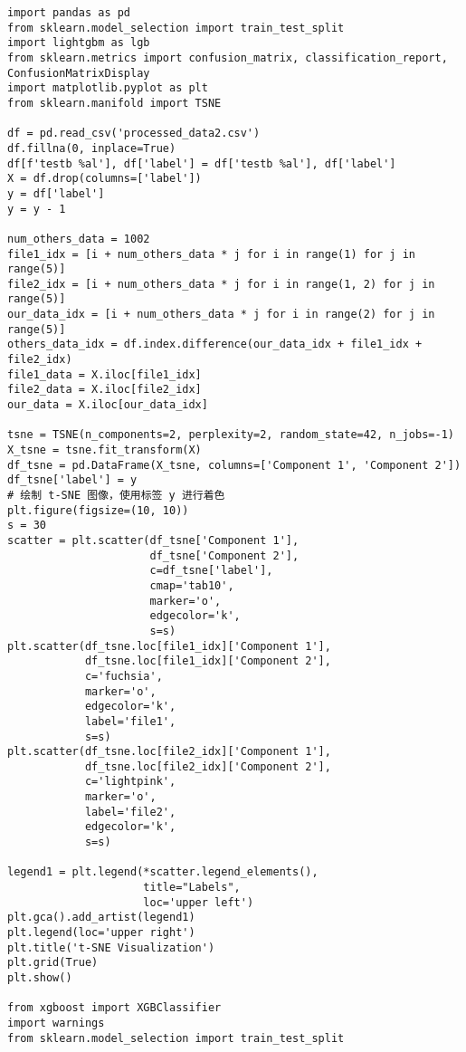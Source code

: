 \begin{lstlisting}
import pandas as pd
from sklearn.model_selection import train_test_split
import lightgbm as lgb
from sklearn.metrics import confusion_matrix, classification_report, ConfusionMatrixDisplay
import matplotlib.pyplot as plt
from sklearn.manifold import TSNE

df = pd.read_csv('processed_data2.csv')
df.fillna(0, inplace=True)
df[f'testb %al'], df['label'] = df['testb %al'], df['label']
X = df.drop(columns=['label'])
y = df['label']
y = y - 1

num_others_data = 1002
file1_idx = [i + num_others_data * j for i in range(1) for j in range(5)]
file2_idx = [i + num_others_data * j for i in range(1, 2) for j in range(5)]
our_data_idx = [i + num_others_data * j for i in range(2) for j in range(5)]
others_data_idx = df.index.difference(our_data_idx + file1_idx + file2_idx)
file1_data = X.iloc[file1_idx]
file2_data = X.iloc[file2_idx]
our_data = X.iloc[our_data_idx]

tsne = TSNE(n_components=2, perplexity=2, random_state=42, n_jobs=-1)
X_tsne = tsne.fit_transform(X)
df_tsne = pd.DataFrame(X_tsne, columns=['Component 1', 'Component 2'])
df_tsne['label'] = y
# 绘制 t-SNE 图像，使用标签 y 进行着色
plt.figure(figsize=(10, 10))
s = 30
scatter = plt.scatter(df_tsne['Component 1'],
                      df_tsne['Component 2'],
                      c=df_tsne['label'],
                      cmap='tab10',
                      marker='o',
                      edgecolor='k',
                      s=s)
plt.scatter(df_tsne.loc[file1_idx]['Component 1'],
            df_tsne.loc[file1_idx]['Component 2'],
            c='fuchsia',
            marker='o',
            edgecolor='k',
            label='file1',
            s=s)
plt.scatter(df_tsne.loc[file2_idx]['Component 1'],
            df_tsne.loc[file2_idx]['Component 2'],
            c='lightpink',
            marker='o',
            label='file2',
            edgecolor='k',
            s=s)

legend1 = plt.legend(*scatter.legend_elements(),
                     title="Labels",
                     loc='upper left')
plt.gca().add_artist(legend1)
plt.legend(loc='upper right')
plt.title('t-SNE Visualization')
plt.grid(True)
plt.show()

from xgboost import XGBClassifier
import warnings
from sklearn.model_selection import train_test_split


\end{lstlisting}
